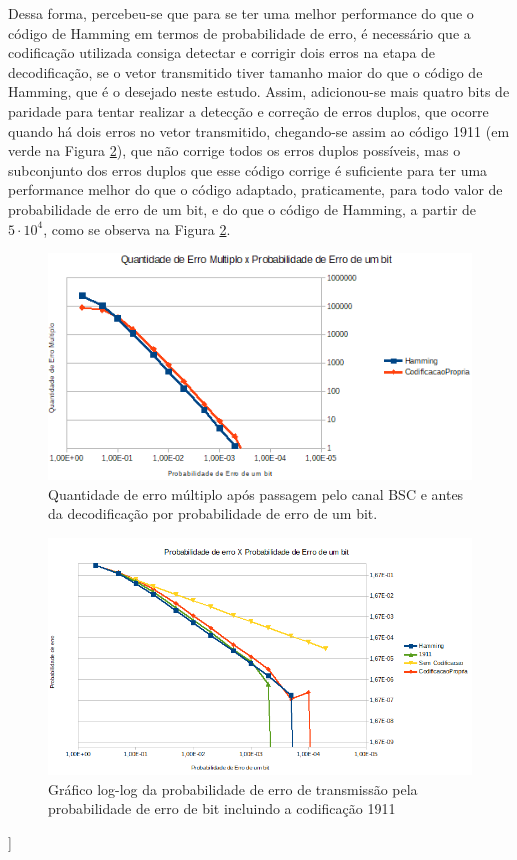 \documentclass[journal,comsoc]{IEEEtran}
\begin{document}
		Dessa forma, percebeu-se que para se ter uma melhor performance do que o código de Hamming em termos de probabilidade de erro, é necessário que a codificação utilizada	consiga detectar e corrigir dois erros na etapa de decodificação, se o vetor transmitido tiver tamanho maior do que o código de Hamming, que é o desejado neste estudo. Assim, adicionou-se mais quatro bits de paridade para tentar	realizar a detecção e correção de erros duplos, que ocorre quando há dois erros no vetor transmitido, chegando-se assim ao código 1911 (em verde na Figura \ref{fig:D}), que não corrige todos os erros duplos possíveis, mas o subconjunto dos erros duplos que esse código corrige é suficiente para ter uma performance melhor do que o código adaptado, praticamente, para todo valor de probabilidade de erro de um bit, e do que o código de Hamming, a partir de $5 \cdot 10^{4}$, como se observa na Figura \ref{fig:D}.
		
		\begin{figure}[hbt]
			\centering
			\includegraphics[width=\columnwidth]{../img/QuantErroMultXp.png}%
			\caption{Quantidade de erro múltiplo após passagem pelo	canal BSC e antes da decodificação por probabilidade de erro de um bit.}%
			\label{fig:C}%
		\end{figure}
	
		\begin{figure}[hbt]
			\centering
			\includegraphics[width=\columnwidth]{../img/PeXp_1911.png}%
			\caption{Gráfico log-log da probabilidade de erro de transmissão pela probabilidade de erro de bit incluindo a codificação 1911}%
			\label{fig:D}%
		\end{figure}]
		
\end{document}
